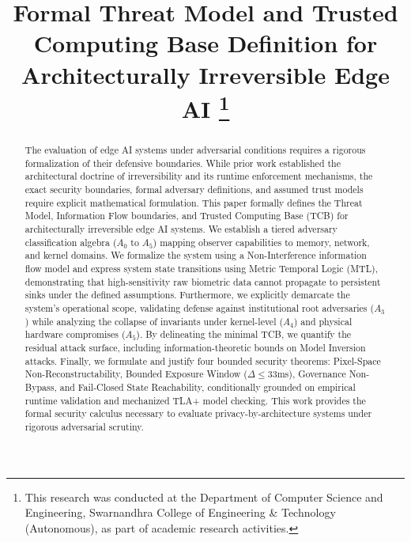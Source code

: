 \documentclass[conference]{IEEEtran}
\begin{document}
\title{Formal Threat Model and Trusted Computing Base Definition for Architecturally Irreversible Edge AI
\thanks{This research was conducted at the Department of Computer Science and Engineering, Swarnandhra College of Engineering \& Technology (Autonomous), as part of academic research activities.}
}

\author{
}

\maketitle

\begin{abstract}
The evaluation of edge AI systems under adversarial conditions requires a rigorous formalization of their defensive boundaries. While prior work established the architectural doctrine of irreversibility and its runtime enforcement mechanisms, the exact security boundaries, formal adversary definitions, and assumed trust models require explicit mathematical formulation. This paper formally defines the Threat Model, Information Flow boundaries, and Trusted Computing Base (TCB) for architecturally irreversible edge AI systems. We establish a tiered adversary classification algebra ($A_0$ to $A_5$) mapping observer capabilities to memory, network, and kernel domains. We formalize the system using a Non-Interference information flow model and express system state transitions using Metric Temporal Logic (MTL), demonstrating that high-sensitivity raw biometric data cannot propagate to persistent sinks under the defined assumptions. Furthermore, we explicitly demarcate the system's operational scope, validating defense against institutional root adversaries ($A_3$) while analyzing the collapse of invariants under kernel-level ($A_4$) and physical hardware compromises ($A_5$). By delineating the minimal TCB, we quantify the residual attack surface, including information-theoretic bounds on Model Inversion attacks. Finally, we formulate and justify four bounded security theorems: Pixel-Space Non-Reconstructability, Bounded Exposure Window ($\Delta \le 33$ms), Governance Non-Bypass, and Fail-Closed State Reachability, conditionally grounded on empirical runtime validation and mechanized TLA+ model checking. This work provides the formal security calculus necessary to evaluate privacy-by-architecture systems under rigorous adversarial scrutiny.
\end{abstract}
\end{document}
